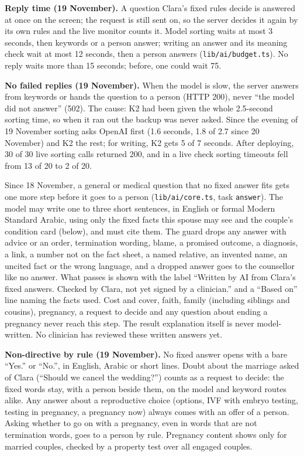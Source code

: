 \documentclass[10.5pt,a4paper]{article}
\newcommand{\code}[1]{\texttt{\small #1}}
\newcommand{\file}[1]{\leavevmode\textcolor{muted}{\texttt{\small #1}}}
\begin{document}
\textbf{Reply time (19 November).} A question Clara's fixed rules decide is answered at once on the screen; the request
is still sent on, so the server decides it again by its own rules and the live monitor counts it. Model sorting waits
at most 3 seconds, then keywords or a person answer; writing an answer and its meaning check wait at most 12 seconds,
then a person answers (\file{lib/ai/budget.ts}). No reply waits more than 15 seconds; before, one could wait 75.

\textbf{No failed replies (19 November).} When the model is slow, the server answers from keywords or hands the
question to a person (HTTP 200), never ``the model did not answer'' (502). The cause: K2 had been given the whole
2.5-second sorting time, so when it ran out the backup was never asked. Since the evening of 19 November sorting asks OpenAI first (1.6 seconds, 1.8 of 2.7 since 20 November) and K2 the rest; for writing, K2 gets 5 of 7 seconds. After deploying, 30 of 30 live sorting
calls returned 200, and in a live check sorting timeouts fell from 13 of 20 to 2 of 20.

Since 18 November, a general or medical question that no fixed answer fits gets one more step before it goes to a
person (\code{lib/ai/core.ts}, task \code{answer}). The model may write one to three short sentences, in English or
formal Modern Standard Arabic, using only the fixed facts this spouse may see and the couple's condition card
(below), and must cite them. The guard drops
any answer with advice or an order, termination wording, blame, a promised outcome, a diagnosis, a link, a number not
on the fact sheet, a named relative, an invented name, an uncited fact or the wrong language, and a dropped answer goes to the counsellor like no answer. What passes is shown with the label
``Written by AI from Clara's fixed answers. Checked by Clara, not yet signed by a clinician.'' and a ``Based
on'' line naming the facts used. Cost and cover, faith, family (including siblings and cousins), pregnancy, a request
to decide and any question about ending a pregnancy never reach this step. The result explanation itself is never model-written. No clinician has
reviewed these written answers yet.

\textbf{Non-directive by rule (19 November).} No fixed answer opens with a bare ``Yes.'' or ``No.'', in English,
Arabic or short lines. Doubt about the marriage asked of Clara (``Should we cancel the wedding?'') counts as a request to
decide: the fixed words stay, with a person beside them, on the model and keyword routes alike. Any answer about a
reproductive choice (options, IVF with embryo testing, testing in pregnancy, a pregnancy now) always comes with an offer
of a person. Asking whether to go on with a pregnancy, even in words that are not termination words, goes to a person
by rule. Pregnancy content shows only for married couples, checked by a property test over all engaged couples.
\end{document}
